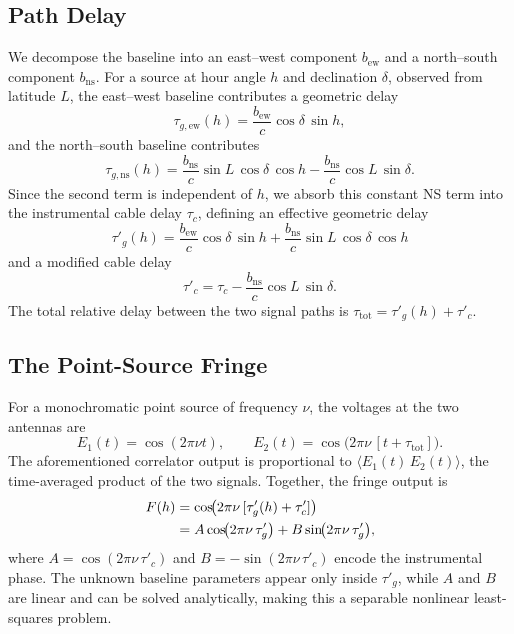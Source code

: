 \documentclass[10pt,preprint2]{aastex}
\begin{document}
\subsection{Path Delay}
\label{sec:delay}

We decompose the baseline into an east--west component $b_{\mathrm{ew}}$ and a north--south component $b_{\mathrm{ns}}$. For a source at hour angle $h$ and declination $\delta$, observed from latitude $L$, the east--west baseline contributes a geometric delay
\begin{equation}
\label{eq:delay_ew}
\tau_{g,\mathrm{ew}}(h) = \frac{b_{\mathrm{ew}}}{c}\cos\delta\,\sin h,
\end{equation}
and the north--south baseline contributes
\begin{equation}
\label{eq:delay_ns}
\tau_{g,\mathrm{ns}}(h) = \frac{b_{\mathrm{ns}}}{c}\sin L\,\cos\delta\,\cos h
  - \frac{b_{\mathrm{ns}}}{c}\cos L\,\sin\delta.
\end{equation}
Since the second term is independent of $h$, we absorb this constant NS term into the instrumental cable delay $\tau_c$, defining an effective geometric delay
\begin{equation}
\label{eq:delay_combined}
\tau'_g(h) = \frac{b_{\mathrm{ew}}}{c}\cos\delta\,\sin h
  + \frac{b_{\mathrm{ns}}}{c}\sin L\,\cos\delta\,\cos h
\end{equation}
and a modified cable delay
\begin{equation}
\label{eq:tauc_prime}
\tau'_c = \tau_c - \frac{b_{\mathrm{ns}}}{c}\cos L\,\sin\delta.
\end{equation}
The total relative delay between the two signal paths is $\tau_{\mathrm{tot}} = \tau'_g(h) + \tau'_c$.


\subsection{The Point-Source Fringe}
\label{sec:fringe}

For a monochromatic point source of frequency $\nu$, the voltages at the two antennas are
\begin{equation}
E_1(t) = \cos(2\pi\nu t), \qquad
E_2(t) = \cos\!\bigl(2\pi\nu\,[t + \tau_{\mathrm{tot}}]\bigr).
\end{equation}
The aforementioned correlator output is proportional to $\langle E_1(t)\,E_2(t)\rangle$, the time-averaged product of the two signals. Together, the fringe output is
\begin{align}
\label{eq:fringe_boxed}
F(h) &= \cos\!\bigl(2\pi\nu\,[\tau'_g(h) + \tau'_c]\bigr) \notag \\
     &= A\cos\!\bigl(2\pi\nu\,\tau'_g\bigr) + B\sin\!\bigl(2\pi\nu\,\tau'_g\bigr),
\end{align}
where $A = \cos(2\pi\nu\,\tau'_c)$ and $B = -\sin(2\pi\nu\,\tau'_c)$ encode the instrumental phase. The unknown baseline parameters appear only inside $\tau'_g$, while $A$ and $B$ are linear and can be solved analytically, making this a separable nonlinear least-squares problem.
\end{document}
